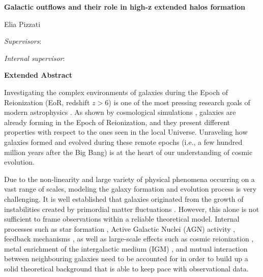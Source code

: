 \documentclass[a4paper, 12pt]{article}
\begin{document}
\begin{center}
\vspace{3cm}
    \textbf{{\Large
    Galactic outflows and their role in high-z extended halos formation}
    }    
    
    \vspace{0.5cm}
    \large
    Elia Pizzati

\end{center}        


    \begin{multicols}{2}
    \hspace{15mm}\noindent\textit{{Supervisors}}:
    
    \hspace{15mm}{\large Prof. Andrea Ferrara}
    
    \hspace{15mm}{\large Dr. Andrea Pallottini}
        \columnbreak
        
    \hspace{10mm}\noindent\textit{{Internal supervisor}}: 
    
    \hspace{10mm}{\large Prof. Michele Cignoni    }
    \end{multicols}

       
    \vspace{0.3cm}
\begin{center}
    \textbf{{Extended Abstract}}
\end{center}


Investigating the complex environments of galaxies during the Epoch of Reionization (EoR, redshift $z>6$) is one of the most pressing research goals of modern astrophysics \citep{Barkana:2000fd, Dayal:2018hft}. As shown by cosmological simulations \citep{Murali_2002,Vogelsberger:2019ynw, somerville2015}, galaxies are already forming in the Epoch of Reionization, and they present different properties with respect to the ones seen in the local Universe. Unraveling how galaxies formed and evolved during these remote epochs (i.e., a few hundred million years after the Big Bang) is at the heart of our understanding of cosmic evolution.

Due to the non-linearity and large variety of physical phenomena occurring on a vast range of scales, modeling the galaxy formation and evolution process is very challenging. It is well established that galaxies originated from the growth of instabilities created by primordial matter fluctuations \citep{bertschinger98}. However, this alone is not sufficient to frame observations within a reliable theoretical model. Internal processes such as star formation \citep{moster2010constraints}, Active Galactic Nuclei (AGN) activity \citep{morganti2017archaeology}, feedback mechanisms \citep{fabian12}, as well as large-scale effects such as cosmic reionization \citep{mesinger_2016}, metal enrichment of the intergalactic medium (IGM) \citep{Aguirre:2001ay}, and mutual interaction between neighbouring galaxies \citep{dressler1980, delucia2007} need to be accounted for in order to build up a solid theoretical background that is able to keep pace with observational data.
\end{document}
